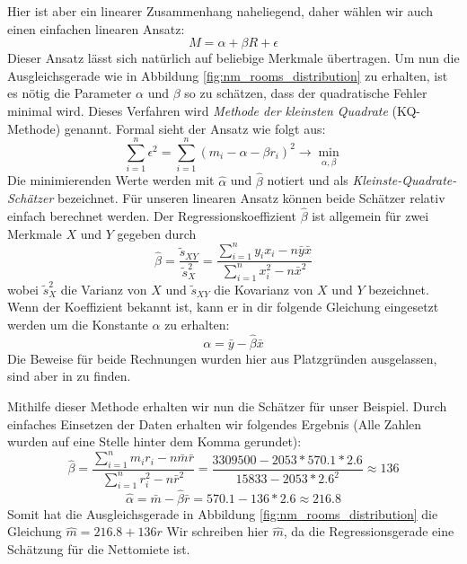 Hier ist aber ein linearer Zusammenhang naheliegend, daher wählen wir auch einen einfachen linearen Ansatz:
\begin{equation*}
  M = \alpha + \beta R + \epsilon
\end{equation*}
Dieser Ansatz lässt sich natürlich auf beliebige Merkmale übertragen.
Um nun die Ausgleichsgerade wie in Abbildung \ref{fig:nm_rooms_distribution} zu erhalten, ist es nötig die Parameter $\alpha$ und $\beta$ so zu schätzen, dass der quadratische Fehler minimal wird.
Dieses Verfahren wird  \textit{Methode der kleinsten Quadrate} (KQ-Methode) genannt.
Formal sieht der Ansatz wie folgt aus:
\begin{equation*}
  \sum\limits_{i=1}^{n} \epsilon^2 = \sum\limits_{i=1}^{n} (m_i - \alpha - \beta r_i)^2 \rightarrow \min\limits_{\alpha, \beta}
\end{equation*}
Die minimierenden Werte werden mit $\hat\alpha$ und $\hat\beta$ notiert und als \textit{Kleinste-Quadrate-Schätzer} bezeichnet.
Für unseren linearen Ansatz können beide Schätzer relativ einfach berechnet werden.
Der Regressionskoeffizient $\hat\beta$ ist allgemein für zwei Merkmale $X$ und $Y$ gegeben durch
\begin{equation*}
  \hat\beta = \frac{\tilde s_{XY}}{\tilde{s}^2_X} = \frac{\sum\limits_{i=1}^{n} y_i x_i - n \bar y \bar x}{\sum\limits_{i=1}^{n} x_i^2 - n \bar{x}^2}
\end{equation*}
wobei $\tilde{s}^2_X$ die Varianz von $X$ und $\tilde s_{XY}$ die Kovarianz von $X$ und $Y$ bezeichnet. 
Wenn der Koeffizient bekannt ist, kann er in dir folgende Gleichung eingesetzt werden um die Konstante $\alpha$ zu erhalten:
\begin{equation*}
  \alpha = \bar y - \hat\beta \bar x
\end{equation*}
Die Beweise für beide Rechnungen wurden hier aus Platzgründen ausgelassen, sind aber in \citet[S. 155]{Fahrmeir2010} zu finden.

Mithilfe dieser Methode erhalten wir nun die Schätzer für unser Beispiel.
Durch einfaches Einsetzen der Daten erhalten wir folgendes Ergebnis (Alle Zahlen wurden auf eine Stelle hinter dem Komma gerundet):
\begin{equation*}
  \hat\beta = \frac{\sum\limits_{i=1}^{n} m_i r_i - n \bar m \bar r}{\sum\limits_{i=1}^{n} r_i^2 - n \bar{r}^2}
  = \frac{3309500 - 2053 * 570.1 * 2.6}{15833 - 2053 * 2.6^2}
  \approx 136
\end{equation*}
\begin{equation*}
  \hat\alpha = \bar m - \hat\beta \bar r 
  = 570.1 - 136 * 2.6 
  \approx 216.8
\end{equation*}
Somit hat die Ausgleichsgerade in Abbildung \ref{fig:nm_rooms_distribution} die Gleichung $\hat m = 216.8 + 136 r$
Wir schreiben hier $\hat m$, da die Regressionsgerade eine Schätzung für die Nettomiete ist.

